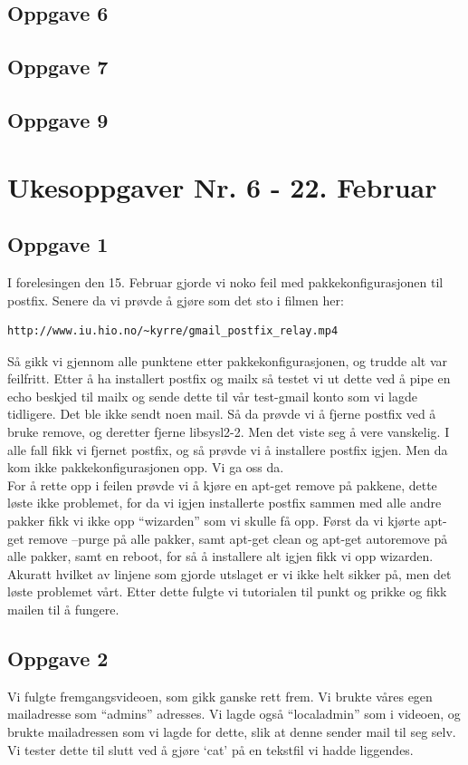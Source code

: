 \documentclass[a4paper, norsk, 12pt]{article}
\begin{document}
\subsection{Oppgave 6}
\subsection{Oppgave 7}
\subsection{Oppgave 9}

\section{Ukesoppgaver Nr. 6 - 22. Februar}
\subsection{Oppgave 1}
I forelesingen den 15. Februar gjorde vi noko feil med pakkekonfigurasjonen til postfix. Senere da vi prøvde å gjøre som det sto i filmen her:
\begin{verbatim}
http://www.iu.hio.no/~kyrre/gmail_postfix_relay.mp4
\end{verbatim}
 
Så gikk vi gjennom alle punktene etter pakkekonfigurasjonen, og trudde alt var feilfritt. Etter å ha installert postfix og mailx så testet vi ut dette ved å pipe en echo beskjed til mailx og sende dette til vår test-gmail konto som vi lagde tidligere. Det ble ikke sendt noen mail. Så da prøvde vi å fjerne postfix ved å bruke remove, og deretter fjerne libsysl2-2. Men det viste seg å vere vanskelig. I alle fall fikk vi fjernet postfix, og så prøvde vi å installere postfix igjen. Men da kom ikke pakkekonfigurasjonen opp. Vi ga oss da.\\

For å rette opp i feilen prøvde vi å kjøre en apt-get remove på pakkene, dette løste ikke problemet, for da vi igjen installerte postfix sammen med alle andre pakker fikk vi ikke opp “wizarden” som vi skulle få opp. Først da vi kjørte apt-get remove --purge på alle pakker, samt apt-get clean og apt-get autoremove på alle pakker, samt en reboot, for så å installere alt igjen fikk vi opp wizarden. Akuratt hvilket av linjene som gjorde utslaget er vi ikke helt sikker på, men det løste problemet vårt. Etter dette fulgte vi tutorialen til punkt og prikke og fikk mailen til å fungere.

\subsection{Oppgave 2}
Vi fulgte fremgangsvideoen, som gikk ganske rett frem. Vi brukte våres egen mailadresse som “admins” adresses. Vi lagde også “localadmin” som i videoen, og brukte mailadressen som vi lagde for dette, slik at denne sender mail til seg selv. Vi tester dette til slutt ved å gjøre ‘cat’ på en tekstfil vi hadde liggendes.\\
\end{document}
